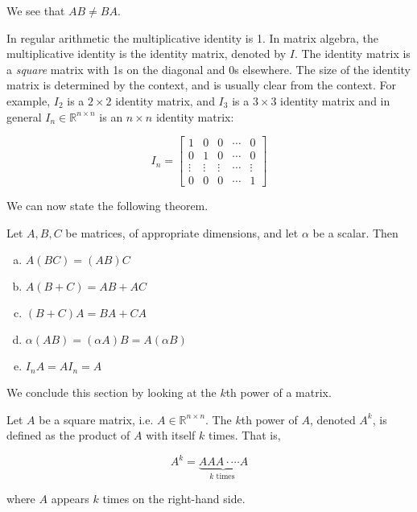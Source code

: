 \begin{solution}
    We see that $AB \neq BA$. \end{solution}

    In regular arithmetic the multiplicative identity is 1. In matrix algebra, the multiplicative identity is the identity matrix, denoted by $I$. The identity matrix is a \textit{square} matrix with 1s on the diagonal and 0s elsewhere. The size of the identity matrix is determined by the context, and is usually clear from the context. For example, $I_2$ is a $2 \times 2$ identity matrix, and $I_3$ is a $3 \times 3$ identity matrix and in general $I_n \in \mathbb{R}^{n \times n}$ is an $n \times n$ identity matrix:

    $$
    I_n=\left[\begin{array}{ccccc}
    1 & 0 & 0 & \cdots & 0 \\
    0 & 1 & 0 & \cdots & 0 \\
    \vdots & \vdots & \vdots & \cdots & \vdots \\
    0 & 0 & 0 & \cdots & 1
    \end{array}\right]
    $$

    We can now state the following theorem.

    \begin{theorem}
        Let $A, B, C$ be matrices, of appropriate dimensions, and let $\alpha$ be a scalar. Then
\begin{enumerate}[(a)]
    \item $A(BC) = (AB)C$
    \item $A(B + C) = AB + AC$
    \item $(B + C)A = BA + CA$
    \item $\alpha(AB) = (\alpha A)B = A(\alpha B)$
    \item $I_n A = AI_n = A$
\end{enumerate}
\end{theorem}

We conclude this section by looking at the $k$th power of a matrix. \newpage

\begin{definition}
    Let $A$ be a square matrix, i.e. $ A \in \mathbb{R}^{n \times n}$. The $k$th power of $A$, denoted $A^k$, is defined as the product of $A$ with itself $k$ times. That is,

    $$
    A^k=\underbrace{ AAA \cdot \cdots A}_{k \text { times }}
    $$

    where $A$ appears $k$ times on the right-hand side.
\end{definition}

